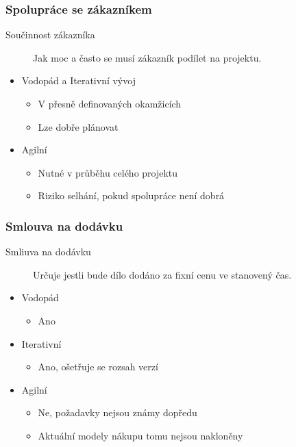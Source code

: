               \subsubsection{Spolupráce se zákazníkem}
                \begin{description}
                  \item[Součinnost zákazníka] Jak moc a často se musí zákazník podílet na projektu.
                \end{description}

                \begin{itemize}
                  \item Vodopád a Iterativní vývoj
                    \begin{itemize}
                      \item V přesně definovaných okamžicích
                      \item Lze dobře plánovat
                    \end{itemize}
                  \item Agilní
                    \begin{itemize}
                      \item Nutné v průběhu celého projektu
                      \item Riziko selhání, pokud spolupráce není dobrá
                    \end{itemize}
                \end{itemize}

                \subsubsection{Smlouva na dodávku}
                  \begin{description}
                    \item[Smliuva na dodávku] Určuje jestli bude dílo dodáno za fixní cenu ve stanovený čas.
                  \end{description}

                  \begin{itemize}
                    \item Vodopád
                      \begin{itemize}
                        \item Ano
                      \end{itemize}
                    \item Iterativní
                      \begin{itemize}
                        \item Ano, ošetřuje se rozsah verzí
                      \end{itemize}
                    \item Agilní
                      \begin{itemize}
                        \item Ne, požadavky nejsou známy dopředu
                        \item Aktuální modely nákupu tomu nejsou nakloněny
                      \end{itemize}
                  \end{itemize}
